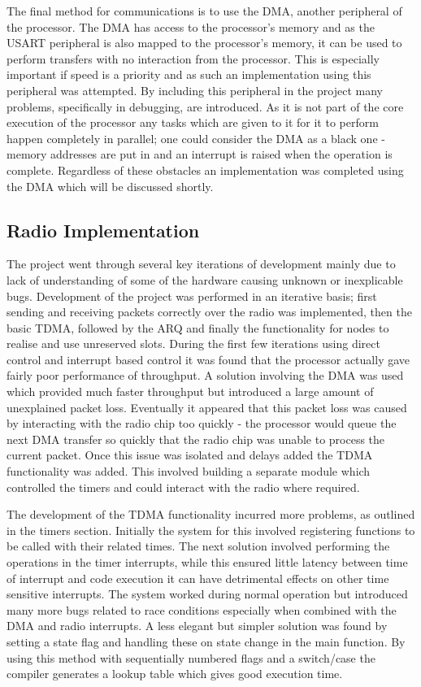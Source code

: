 \documentclass[parskip]{cs4rep}
\begin{document}
The final method for communications is to use the DMA, another peripheral of the processor. The DMA has access to the processor's memory and as the USART peripheral is also mapped to the processor's memory, it can be used to perform transfers with no interaction from the processor. This is especially important if speed is a priority and as such an implementation using this peripheral was attempted. By including this peripheral in the project many problems, specifically in debugging, are introduced. As it is not part of the core execution of the processor any tasks which are given to it for it to perform happen completely in parallel; one could consider the DMA as a black one - memory addresses are put in and an interrupt is raised when the operation is complete. Regardless of these obstacles an implementation was completed using the DMA which will be discussed shortly. 

\subsection{Radio Implementation}

The project went through several key iterations of development mainly due to lack of understanding of some of the hardware causing unknown or inexplicable bugs. Development of the project was performed in an iterative basis; first sending and receiving packets correctly over the radio was implemented, then the basic TDMA, followed by the ARQ and finally the functionality for nodes to realise and use unreserved slots. During the first few iterations using direct control and interrupt based control it was found that the processor actually gave fairly poor performance of throughput. A solution involving the DMA was used which provided much faster throughput but introduced a large amount of unexplained packet loss. Eventually it appeared that this packet loss was caused by interacting with the radio chip too quickly - the processor would queue the next DMA transfer so quickly that the radio chip was unable to process the current packet. Once this issue was isolated and delays added the TDMA functionality was added. This involved building a separate module which controlled the timers and could interact with the radio where required. 

The development of the TDMA functionality incurred more problems, as outlined in the timers section. Initially the system for this involved registering functions to be called with their related times. The next solution involved performing the operations in the timer interrupts, while this ensured little latency between time of interrupt and code execution it can have detrimental effects on other time sensitive interrupts. The system worked during normal operation but introduced many more bugs related to race conditions especially when combined with the DMA and radio interrupts. A less elegant but simpler solution was found by setting a state flag and handling these on state change in the main function. By using this method with sequentially numbered flags and a switch/case the compiler generates a lookup table which gives good execution time. 
\end{document}
